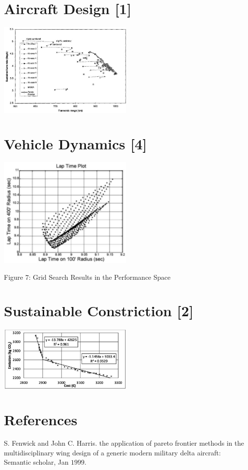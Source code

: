 \section{Aircraft Design [1]}
\includegraphics[width=0.5\textwidth]{optimization/multi-objective/images/2022_02_28_634e8079070800ac7e3cg-21}

\section{Vehicle Dynamics [4]}
\includegraphics[width=0.5\textwidth]{optimization/multi-objective/images/2022_02_28_634e8079070800ac7e3cg-22}

Figure 7: Grid Search Results in the Performance Space

\section{Sustainable Constriction [2]}
\includegraphics[width=0.5\textwidth]{optimization/multi-objective/images/2022_02_28_634e8079070800ac7e3cg-23}

\section{References}
S. Fenwick and John C. Harris. the application of pareto frontier methods in the multidisciplinary wing design of a generic modern military delta aircraft: Semantic scholar, Jan $1999 .$


